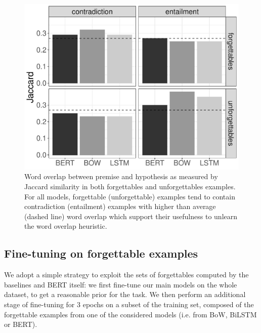 \begin{figure}[t]
\centering
  \includegraphics[scale=0.45]{figures/jaccard_plot.pdf}
  \caption{Word overlap between premise and hypothesis as measured by Jaccard similarity in both forgettables and unforgettables examples. For all models, forgettable (unforgettable) examples tend to contain contradiction (entailment) examples with higher than average (dashed line) word overlap which support their usefulness to unlearn the word overlap heuristic.}
\label{fig:wordoverlap-unforg}
\end{figure}

\subsection{Fine-tuning on forgettable examples}
\label{sec:fine_tune}
We adopt a simple strategy to exploit the sets of forgettables computed by the baselines and BERT itself: we first fine-tune our main models on the whole dataset, to get a reasonable prior for the task. We then perform an additional stage of fine-tuning for $3$ epochs on a subset of the training set, composed of the forgettable examples from one of the considered models (i.e. from BoW, BiLSTM or BERT).

\iffalse
